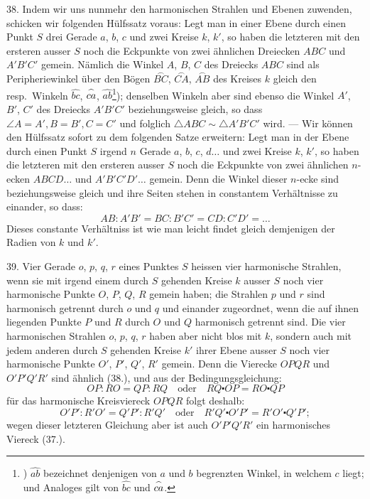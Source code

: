 38. Indem wir uns nunmehr den harmonischen Strahlen
und Ebenen zuwenden, schicken wir folgenden H\"ulfssatz
voraus: Legt man in einer Ebene durch einen Punkt $S$ drei
Gerade $a$, $b$, $c$ und zwei Kreise $k$, $k'$, so haben die letzteren
mit den ersteren ausser $S$ noch die Eckpunkte von zwei
\"ahnlichen Dreiecken $ABC$ und $A'B'C'$ gemein. N\"amlich die
Winkel $A$, $B$, $C$ des Dreiecks $ABC$ sind als Peripheriewinkel
\"uber den B\"ogen
$\stackrel{\frown}{BC}$,%
$\stackrel{\frown}{CA}$,%
$\stackrel{\frown}{AB}$
des Kreises $k$ gleich den
resp.\ Winkeln
$\widehat{bc}$,
$\widehat{\vphantom{b}ca}$,
$\widehat{ab}$\footnote{)
  $\widehat{ab}$ bezeichnet denjenigen von $a$ und $b$ begrenzten Winkel, in
  welchem $c$  liegt; und Analoges gilt von $\widehat{bc}$ und $\widehat{\vphantom{b}ca}$.});
denselben Winkeln aber sind
ebenso die Winkel $A'$, $B'$, $C'$ des Dreiecks $A'B'C'$ beziehungsweise
gleich, so dass $\angle A = A', B = B', C = C'$ und folglich
$\triangle ABC \sim \triangle A'B'C'$ wird. --- Wir k\"onnen den H\"ulfssatz
sofort zu dem folgenden Satze erweitern: Legt man in
der Ebene durch einen Punkt $S$ irgend $n$ Gerade $a$, $b$, $c$, $d\ldots$
und zwei Kreise $k$, $k'$, so haben die letzteren mit den ersteren
ausser $S$ noch die Eckpunkte von zwei \"ahnlichen $n$-ecken
$ABCD\ldots$ und $A'B'C'D'\ldots$ gemein. Denn die Winkel
dieser $n$-ecke sind beziehungsweise gleich und ihre Seiten
stehen in constantem Verh\"altnisse zu einander, so dass:
\[
AB : A'B' = BC : B'C' = CD : C'D' = \ldots
\]
Dieses constante Verh\"altniss ist wie man leicht findet gleich
demjenigen der Radien von $k$ und $k'$.

39. Vier Gerade $o$, $p$, $q$, $r$ eines Punktes $S$ heissen {\glqq}vier
harmonische Strahlen{\grqq}, wenn sie mit irgend einem durch $S$
gehenden Kreise $k$ ausser $S$ noch vier harmonische Punkte
$O$, $P$, $Q$, $R$ gemein haben; die Strahlen $p$ und $r$ sind {\glqq}harmonisch
getrennt{\grqq} durch $o$ und $q$ und {\glqq}einander zugeordnet{\grqq},
wenn die auf ihnen liegenden Punkte $P$ und $R$ durch $O$ und
$Q$ harmonisch getrennt sind. Die vier harmonischen Strahlen
$o$, $p$, $q$, $r$ haben aber nicht blos mit $k$, sondern auch mit
jedem anderen durch $S$ gehenden Kreise $k'$ ihrer Ebene ausser
$S$ noch vier harmonische Punkte $O'$, $P'$, $Q'$, $R'$ gemein. Denn
die Vierecke $OPQR$ und $O'P'Q'R'$ sind \"ahnlich (38.), und
aus der Bedingungsgleichung:
\[
OP : RO = QP : RQ \quad\text{oder}\quad RQ \centerdot OP = RO \centerdot QP
\]
f\"ur das harmonische Kreisviereck $OPQR$ folgt deshalb:
\[
O'P' : R'O' = Q'P' : R'Q' \quad\text{oder}\quad R'Q' \centerdot O'P' = R'O' \centerdot Q'P';
\]
wegen dieser letzteren Gleichung aber ist auch $O'P'Q'R'$ ein
harmonisches Viereck (37.).

